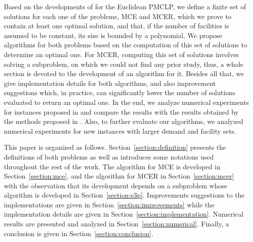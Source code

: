 Based on the developments of \cite{church:1984} for the Euclidean PMCLP, we define a finite set of solutions for each one of the problems, MCE and MCER, which we prove to contain at least one optimal solution, and that, if the number of facilities is assumed to be constant, its size is bounded by a polynomial.
We propose algorithms for both problems based on the computation of this set of solutions to determine an optimal one.
For MCER, computing this set of solutions involves solving a subproblem, on which we could not find any prior study, thus, a whole section is devoted to the development of an algorithm for it.
Besides all that, we give implementation details for both algorithms, and also improvement suggestions which, in practice, can significantly lower the number of solutions evaluated to return an optimal one.
In the end, we analyze numerical experiments for instances proposed in \cite{canbolat, andreta} and compare the results with the results obtained by the methods proposed in \cite{andreta}. Also, to further {\color{blue}evaluate} our algorithms, we analyzed numerical experiments for new instances with larger demand and facility sets.

{\color{Red}
This paper is organized as follows. Section~\ref{section:definition} presents the definitions of both problems as well as introduces some notations used throughout the rest of the work. The algorithm for MCE is developed in Section~\ref{section:mce}, and the algorithm for MCER in Section~\ref{section:mcer} with the observation that its development depends on a subproblem whose algorithm is developed in Section~\ref{section:e3p}. Improvements suggestions to the implementations are given in Section~\ref{section:improvements} while the implementation details are given in Section~\ref{section:implementation}. Numerical results are presented and analyzed in Section~\ref{section:numerical}. Finally, a conclusion is given in Section~\ref{section:conclusion}.
}
